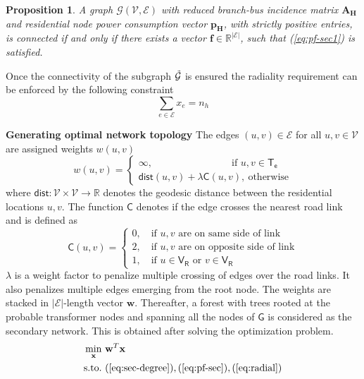 \documentclass[sigconf]{acmart}
\newtheorem{proposition}{\textbf{Proposition}}
\begin{document}
\begin{proposition}
	A graph $\mathcal{G}(\mathcal{V},\mathcal{E})$ with reduced branch-bus incidence matrix $\mathbf{A_H}$ and residential node power consumption vector $\mathbf{p_H}$, with strictly positive entries, is connected if and only if there exists a vector $\mathbf{f}\in\mathbb{R}^{|\mathcal{E}|}$, such that (\ref{eq:pf-sec1}) is satisfied.
	\label{prop-1}
\end{proposition}

\noindent Once the connectivity of the subgraph $\Tilde{\mathcal{G}}$ is ensured the radiality requirement can be enforced by the following constraint
\begin{equation}
	\sum_{e\in\mathcal{E}}x_e=n_h\label{eq:radial}
\end{equation}

\noindent\textbf{Generating optimal network topology}
The edges $(u,v)\in\mathcal{E}$ for all $u,v\in\mathcal{V}$ are assigned weights $w(u,v)$
\begin{equation}
	w(u,v)=
	\begin{cases}
		\infty,\quad\quad\quad\quad\quad\quad\quad\quad\textrm{if }u,v\in\mathsf{T_e}\\
		\mathsf{dist}(u,v)+\lambda \mathsf{C}(u,v),~\textrm{otherwise}
	\end{cases}
	\label{eq:weight}
\end{equation}
where $\mathsf{dist}:\mathcal{V}\times\mathcal{V}\rightarrow\mathbb{R}$ denotes the geodesic distance between the residential locations $u,v$. The function $\mathsf{C}$ denotes if the edge crosses the nearest road link and is defined as
$$
\mathsf{C}(u,v)=
\begin{cases}
0,\quad \textrm{if }u,v\textrm{ are on same side of link}\\
2,\quad \textrm{if }u,v\textrm{ are on opposite side of link}\\
1,\quad \textrm{if }u\in\mathsf{V_R}\textrm{ or }v\in\mathsf{V_R}
\end{cases}
$$
$\lambda$ is a weight factor to penalize multiple crossing of edges over the road links. It also penalizes multiple edges emerging from the root node. The weights are stacked in $|\mathcal{E}|$-length vector $\mathbf{w}$. Thereafter, a forest with trees rooted at the probable transformer nodes and spanning all the nodes of $\mathsf{G}$ is considered as the secondary network. This is obtained after solving the optimization problem.
\begin{equation}
	\begin{aligned}
		\min_{\mathbf{x}}&~\mathbf{w}^T\mathbf{x}\\
		\textrm{s.to.}&~(\ref{eq:sec-degree}),(\ref{eq:pf-sec}),(\ref{eq:radial})
	\end{aligned}
\end{equation}
\end{document}
